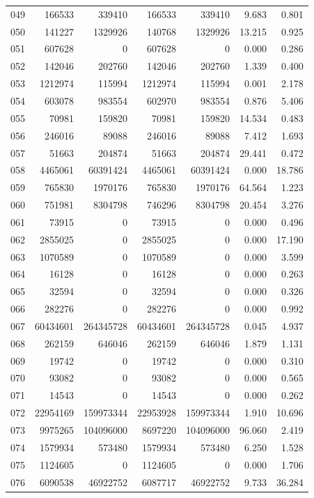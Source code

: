 \begin{longtable}{lrrrrrr}
049 & 166533 & 339410 & 166533 & 339410 & 9.683 & 0.801\\
050 & 141227 & 1329926 & 140768 & 1329926 & 13.215 & 0.925\\
051 & 607628 & 0 & 607628 & 0 & 0.000 & 0.286\\
052 & 142046 & 202760 & 142046 & 202760 & 1.339 & 0.400\\
053 & 1212974 & 115994 & 1212974 & 115994 & 0.001 & 2.178\\
054 & 603078 & 983554 & 602970 & 983554 & 0.876 & 5.406\\
055 & 70981 & 159820 & 70981 & 159820 & 14.534 & 0.483\\
056 & 246016 & 89088 & 246016 & 89088 & 7.412 & 1.693\\
057 & 51663 & 204874 & 51663 & 204874 & 29.441 & 0.472\\
058 & 4465061 & 60391424 & 4465061 & 60391424 & 0.000 & 18.786\\
059 & 765830 & 1970176 & 765830 & 1970176 & 64.564 & 1.223\\
060 & 751981 & 8304798 & 746296 & 8304798 & 20.454 & 3.276\\
061 & 73915 & 0 & 73915 & 0 & 0.000 & 0.496\\
062 & 2855025 & 0 & 2855025 & 0 & 0.000 & 17.190\\
063 & 1070589 & 0 & 1070589 & 0 & 0.000 & 3.599\\
064 & 16128 & 0 & 16128 & 0 & 0.000 & 0.263\\
065 & 32594 & 0 & 32594 & 0 & 0.000 & 0.326\\
066 & 282276 & 0 & 282276 & 0 & 0.000 & 0.992\\
067 & 60434601 & 264345728 & 60434601 & 264345728 & 0.045 & 4.937\\
068 & 262159 & 646046 & 262159 & 646046 & 1.879 & 1.131\\
069 & 19742 & 0 & 19742 & 0 & 0.000 & 0.310\\
070 & 93082 & 0 & 93082 & 0 & 0.000 & 0.565\\
071 & 14543 & 0 & 14543 & 0 & 0.000 & 0.262\\
072 & 22954169 & 159973344 & 22953928 & 159973344 & 1.910 & 10.696\\
073 & 9975265 & 104096000 & 8697220 & 104096000 & 96.060 & 2.419\\
074 & 1579934 & 573480 & 1579934 & 573480 & 6.250 & 1.528\\
075 & 1124605 & 0 & 1124605 & 0 & 0.000 & 1.706\\
076 & 6090538 & 46922752 & 6087717 & 46922752 & 9.733 & 36.284\\

\end{longtable}
